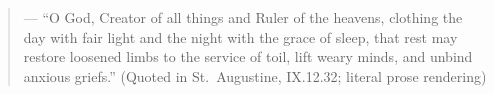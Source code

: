 \begin{quote}
 --- ``O God, Creator of all things and Ruler of the heavens, clothing the day with fair light and the night with the grace of sleep, that rest may restore loosened limbs to the service of toil, lift weary minds, and unbind anxious griefs.'' (Quoted in St.~Augustine,  IX.12.32; literal prose rendering)
\end{quote}
